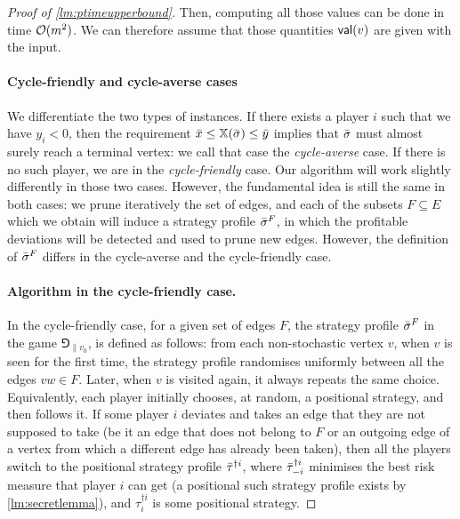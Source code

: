 \begin{proof}[Proof of \cref{lm:ptimeupperbound}]
Then, computing all those values can be done in time $\mathcal{O}(m^2)$.
We can therefore assume that those quantities $\mathsf{val}(v)$ are given with the input.




    \paragraph*{Cycle-friendly and cycle-averse cases}

We differentiate the two types of instances. 
    If there exists a player $i$ such that we have $y_i < 0$, then the requirement ${\bar{x}} \leq \mathbb{X}({\bar{\sigma}}) \leq {\bar{y}}$ implies that ${\bar{\sigma}}$ must almost surely reach a terminal vertex: we call that case the \emph{cycle-averse} case.
    If there is no such player, we are in the \emph{cycle-friendly} case.
    Our algorithm will work slightly differently in those two cases.
    However, the fundamental idea is still the same in both cases: we prune iteratively the set of edges, and each of the subsets $F \subseteq E$ which we obtain will induce a strategy profile ${\bar{\sigma}}^F$, in which the profitable deviations will be detected and used to prune new edges.
    However, the definition of ${\bar{\sigma}}^F$ differs in the cycle-averse and the cycle-friendly case.

 
    
    \paragraph*{Algorithm in the cycle-friendly case.}
    In the cycle-friendly case, for a given set of edges $F$, the strategy profile ${\bar{\sigma}}^F$ in the game $\Game_{\|v_0}$, is defined as follows: from each non-stochastic vertex $v$, when $v$ is seen for the first time, the strategy profile randomises uniformly between all the edges $vw \in F$.
    Later, when $v$ is visited again, it always repeats the same choice.
    Equivalently, each player initially chooses, at random, a positional strategy, and then follows it.
    If some player $i$ deviates and takes an edge that they are not supposed to take (be it an edge that does not belong to $F$ or an outgoing edge of a vertex from which a different edge has already been taken), then all the players switch to the positional strategy profile ${\bar{\tau}}^{\dag i}$, where ${\bar{\tau}}^{\dag i}_{-i}$ minimises the best risk measure that player $i$ can get (a positional such strategy profile exists by \cref{lm:secretlemma}), and $\tau^{\dag i}_i$ is some positional strategy.


\end{proof}
